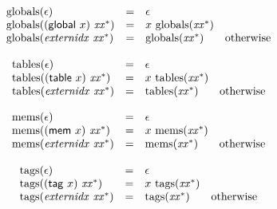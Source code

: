 $$
\begin{array}[t]{@{}lcl@{}l@{}}
{\mathrm{globals}}(\epsilon) & = & \epsilon \\
{\mathrm{globals}}((\mathsf{global}~x)~{{\mathit{xx}}^\ast}) & = & x~{\mathrm{globals}}({{\mathit{xx}}^\ast}) \\
{\mathrm{globals}}({\mathit{externidx}}~{{\mathit{xx}}^\ast}) & = & {\mathrm{globals}}({{\mathit{xx}}^\ast}) & \quad \mbox{otherwise} \\
\end{array}
$$

$$
\begin{array}[t]{@{}lcl@{}l@{}}
{\mathrm{tables}}(\epsilon) & = & \epsilon \\
{\mathrm{tables}}((\mathsf{table}~x)~{{\mathit{xx}}^\ast}) & = & x~{\mathrm{tables}}({{\mathit{xx}}^\ast}) \\
{\mathrm{tables}}({\mathit{externidx}}~{{\mathit{xx}}^\ast}) & = & {\mathrm{tables}}({{\mathit{xx}}^\ast}) & \quad \mbox{otherwise} \\
\end{array}
$$

$$
\begin{array}[t]{@{}lcl@{}l@{}}
{\mathrm{mems}}(\epsilon) & = & \epsilon \\
{\mathrm{mems}}((\mathsf{mem}~x)~{{\mathit{xx}}^\ast}) & = & x~{\mathrm{mems}}({{\mathit{xx}}^\ast}) \\
{\mathrm{mems}}({\mathit{externidx}}~{{\mathit{xx}}^\ast}) & = & {\mathrm{mems}}({{\mathit{xx}}^\ast}) & \quad \mbox{otherwise} \\
\end{array}
$$

$$
\begin{array}[t]{@{}lcl@{}l@{}}
{\mathrm{tags}}(\epsilon) & = & \epsilon \\
{\mathrm{tags}}((\mathsf{tag}~x)~{{\mathit{xx}}^\ast}) & = & x~{\mathrm{tags}}({{\mathit{xx}}^\ast}) \\
{\mathrm{tags}}({\mathit{externidx}}~{{\mathit{xx}}^\ast}) & = & {\mathrm{tags}}({{\mathit{xx}}^\ast}) & \quad \mbox{otherwise} \\
\end{array}
$$

\vspace{1ex}


